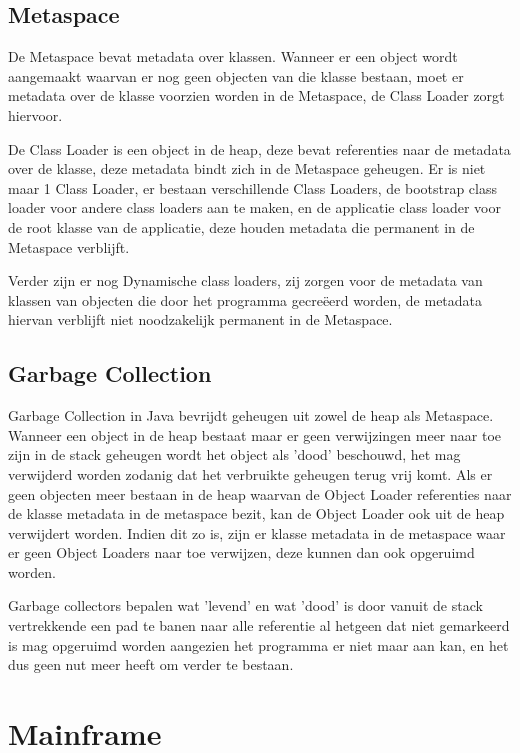 \subsection{Metaspace}
\label{sec:Metaspace}
De Metaspace bevat metadata over klassen.
Wanneer er een object wordt aangemaakt waarvan er nog geen objecten van die klasse bestaan, moet er metadata over de klasse voorzien worden in de Metaspace, de Class Loader zorgt hiervoor.

De Class Loader is een object in de heap, deze bevat referenties naar de metadata over de klasse, deze metadata bindt zich in de Metaspace geheugen.
Er is niet maar 1 Class Loader, er bestaan verschillende Class Loaders, de bootstrap class loader voor andere class loaders aan te maken, en de applicatie class loader voor de root klasse van de applicatie, deze houden metadata die permanent in de Metaspace verblijft.

Verder zijn er nog Dynamische class loaders, zij zorgen voor de metadata van klassen van objecten die door het programma gecreëerd worden, de metadata hiervan verblijft niet noodzakelijk permanent in de Metaspace.
\autocite{Putten2022}
\subsection{Garbage Collection}
\label{sec:garbage collection}
Garbage Collection in Java bevrijdt geheugen uit zowel de heap als Metaspace.
Wanneer een object in de heap bestaat maar er geen verwijzingen meer naar toe zijn in de stack geheugen wordt het object als 'dood' beschouwd, het mag verwijderd worden zodanig dat het verbruikte geheugen terug vrij komt.
Als er geen objecten meer bestaan in de heap waarvan de Object Loader referenties naar de klasse metadata in de metaspace bezit, kan de Object Loader ook uit de heap verwijdert worden.
Indien dit zo is, zijn er klasse metadata in de metaspace waar er geen Object Loaders naar toe verwijzen, deze kunnen dan ook opgeruimd worden. \autocite{Putten2022}

Garbage collectors bepalen wat 'levend' en wat 'dood' is door vanuit de stack vertrekkende een pad te banen naar alle referentie %
al hetgeen dat niet gemarkeerd is mag opgeruimd worden aangezien het programma er niet maar aan kan, en het dus geen nut meer heeft om verder te bestaan.
\section{Mainframe}
\label{sec:mainframe}
